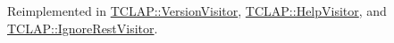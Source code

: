Reimplemented in \hyperlink{class_t_c_l_a_p_1_1_version_visitor_a30b0d5bd22ac41364d027b94bded4fc0}{T\-C\-L\-A\-P\-::\-Version\-Visitor}, \hyperlink{class_t_c_l_a_p_1_1_help_visitor_a157294efe254edb2b713b7c458aad3f2}{T\-C\-L\-A\-P\-::\-Help\-Visitor}, and \hyperlink{class_t_c_l_a_p_1_1_ignore_rest_visitor_ac2a054ed72b16608a32021c65a600722}{T\-C\-L\-A\-P\-::\-Ignore\-Rest\-Visitor}.

